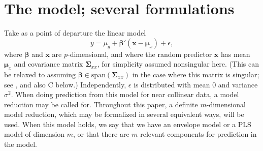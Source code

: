 \documentclass[num-refs]{wiley-article}
\begin{document}
\section{The model; several formulations}

Take as a point of departure the linear model
\begin{equation}
  \label{model}
  y=\mu_{y}+\bm{\beta}'(\bm{x}-\bm{\mu}_{x})+\epsilon,
\end{equation}
where $\bm{\beta}$ and $\bm{x}$ are $p$-dimensional, and where the random predictor $\bm{x}$ has mean $\bm{\mu}_{x}$ and covariance matrix $\bm{\Sigma}_{xx}$, for simplicity assumed nonsingular here. (This can be relaxed to assuming $\bm{\beta}\in\mathrm{span}(\bm{\Sigma}_{xx})$ in the case where this matrix is singular; see \citet{cook2013envelopes}, and also C below.) Independently, $\epsilon$ is distributed with mean $0$ and variance $\sigma^2$. When doing prediction from this model for near collinear data, a model reduction may be called for. Throughout this paper, a definite $m$-dimensional model reduction, which may be formalized in several equivalent ways, will be used. When this model holds, we say that we have an envelope model or a PLS model of dimension $m$, or that there are $m$ relevant components for prediction in the model. \smallskip
\end{document}
